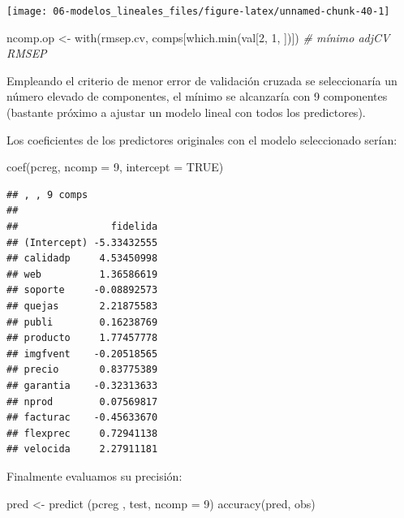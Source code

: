 \documentclass[
  spanish,
]{book}
\newenvironment{Shaded}{\begin{snugshade}}{\end{snugshade}}
\newcommand{\AttributeTok}[1]{\textcolor[rgb]{0.77,0.63,0.00}{#1}}
\newcommand{\CommentTok}[1]{\textcolor[rgb]{0.56,0.35,0.01}{\textit{#1}}}
\newcommand{\ConstantTok}[1]{\textcolor[rgb]{0.00,0.00,0.00}{#1}}
\newcommand{\DecValTok}[1]{\textcolor[rgb]{0.00,0.00,0.81}{#1}}
\newcommand{\FunctionTok}[1]{\textcolor[rgb]{0.00,0.00,0.00}{#1}}
\newcommand{\NormalTok}[1]{#1}
\newcommand{\OtherTok}[1]{\textcolor[rgb]{0.56,0.35,0.01}{#1}}
\theoremstyle{break}
\theoremstyle{definition}
\theoremstyle{definition}
\theoremstyle{definition}
\theoremstyle{definition}
\theoremstyle{remark}
\begin{document}
\begin{center}\texttt{[image: 06-modelos\_lineales\_files/figure-latex/unnamed-chunk-40-1]} \end{center}

\begin{Shaded}
\begin{Highlighting}[]
\NormalTok{ncomp.op }\OtherTok{\textless{}{-}} \FunctionTok{with}\NormalTok{(rmsep.cv, comps[}\FunctionTok{which.min}\NormalTok{(val[}\DecValTok{2}\NormalTok{, }\DecValTok{1}\NormalTok{, ])]) }\CommentTok{\# mínimo adjCV RMSEP}
\end{Highlighting}
\end{Shaded}

Empleando el criterio de menor error de validación cruzada se seleccionaría un número elevado de componentes, el mínimo se alcanzaría con 9 componentes (bastante próximo a ajustar un modelo lineal con todos los predictores).

Los coeficientes de los predictores originales con el modelo seleccionado serían:

\begin{Shaded}
\begin{Highlighting}[]
\FunctionTok{coef}\NormalTok{(pcreg, }\AttributeTok{ncomp =} \DecValTok{9}\NormalTok{, }\AttributeTok{intercept =} \ConstantTok{TRUE}\NormalTok{)}
\end{Highlighting}
\end{Shaded}

\begin{verbatim}
## , , 9 comps
## 
##                fidelida
## (Intercept) -5.33432555
## calidadp     4.53450998
## web          1.36586619
## soporte     -0.08892573
## quejas       2.21875583
## publi        0.16238769
## producto     1.77457778
## imgfvent    -0.20518565
## precio       0.83775389
## garantia    -0.32313633
## nprod        0.07569817
## facturac    -0.45633670
## flexprec     0.72941138
## velocida     2.27911181
\end{verbatim}

Finalmente evaluamos su precisión:

\begin{Shaded}
\begin{Highlighting}[]
\NormalTok{pred }\OtherTok{\textless{}{-}} \FunctionTok{predict}\NormalTok{ (pcreg , test, }\AttributeTok{ncomp =} \DecValTok{9}\NormalTok{)}
\FunctionTok{accuracy}\NormalTok{(pred, obs)}
\end{Highlighting}
\end{Shaded}
\end{document}

